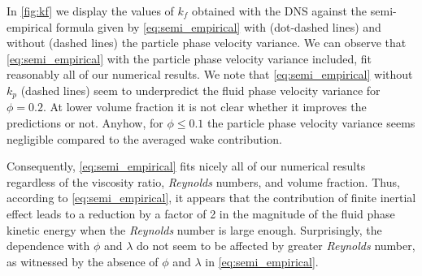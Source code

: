 In  \ref{fig:kf} we display the values of $k_f$ obtained with the DNS against the semi-empirical formula given by \ref{eq:semi_empirical} with (dot-dashed lines) and without (dashed lines) the particle phase velocity variance. 
We can observe that \ref{eq:semi_empirical} with the particle phase velocity variance included, fit reasonably all of our numerical results. 
We note that \ref{eq:semi_empirical} without $k_p$ (dashed lines) seem to underpredict the fluid phase velocity variance for $\phi = 0.2$. 
At lower volume fraction it is not clear whether it improves the predictions or not. 
Anyhow, for $\phi \le 0.1$ the particle phase velocity variance seems negligible compared to the averaged wake contribution. 

Consequently, \ref{eq:semi_empirical}  fits nicely all of our numerical results regardless of the viscosity ratio, \textit{Reynolds} numbers, and volume fraction.  
Thus, according to \ref{eq:semi_empirical}, it appears that the contribution of finite inertial effect leads to a reduction by a factor of 2 in the magnitude of the fluid phase kinetic energy when the \textit{Reynolds} number is large enough. 
Surprisingly, the dependence with $\phi$ and $\lambda$ do not seem to be affected by greater \textit{Reynolds} number, as witnessed by the absence of $\phi$ and $\lambda$ in \ref{eq:semi_empirical}. 
